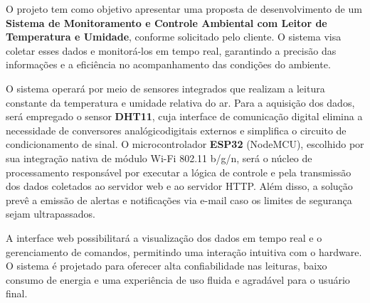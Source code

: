 O projeto tem como objetivo apresentar uma proposta de desenvolvimento de um \textbf{Sistema de Monitoramento e Controle Ambiental com Leitor de Temperatura e Umidade}, conforme solicitado pelo cliente. O sistema visa coletar esses dados e monitorá-los em tempo real, garantindo a precisão das informações e a eficiência no acompanhamento das condições do ambiente.

O sistema operará por meio de sensores integrados que realizam a leitura constante da temperatura e umidade relativa do ar. Para a aquisição dos dados, será empregado o sensor \textbf{DHT11}, cuja interface de comunicação digital elimina a necessidade de conversores analógicodigitais externos e simplifica o circuito de condicionamento de sinal. O microcontrolador \textbf{ESP32} (NodeMCU), escolhido por sua integração nativa de módulo Wi-Fi 802.11 b/g/n, será o núcleo de processamento responsável por executar a lógica de controle e pela transmissão dos dados coletados ao servidor web e ao servidor HTTP. Além disso, a solução prevê a emissão de alertas e notificações via e-mail caso os limites de segurança sejam ultrapassados.

A interface web possibilitará a visualização dos dados em tempo real e o gerenciamento de comandos, permitindo uma interação intuitiva com o hardware. O sistema é projetado para oferecer alta confiabilidade nas leituras, baixo consumo de energia e uma experiência de uso fluida e agradável para o usuário final.